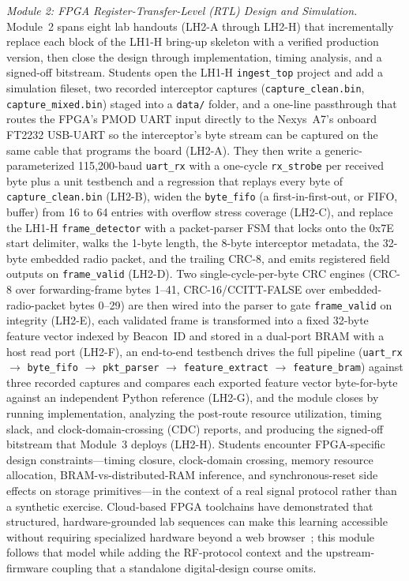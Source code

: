 \documentclass[conference]{IEEEtran}
\begin{document}
\textit{Module 2: FPGA Register-Transfer-Level (RTL) Design and Simulation.} Module~2 spans eight lab handouts (LH2-A through LH2-H) that incrementally replace each block of the LH1-H bring-up skeleton with a verified production version, then close the design through implementation, timing analysis, and a signed-off bitstream. Students open the LH1-H \texttt{ingest\_top} project and add a simulation fileset, two recorded interceptor captures (\texttt{capture\_clean.bin}, \texttt{capture\_mixed.bin}) staged into a \texttt{data/} folder, and a one-line passthrough that routes the FPGA's PMOD UART input directly to the Nexys~A7's onboard FT2232 USB-UART so the interceptor's byte stream can be captured on the same cable that programs the board (LH2-A). They then write a generic-parameterized 115{,}200-baud \texttt{uart\_rx} with a one-cycle \texttt{rx\_strobe} per received byte plus a unit testbench and a regression that replays every byte of \texttt{capture\_clean.bin} (LH2-B), widen the \texttt{byte\_fifo} (a first-in-first-out, or FIFO, buffer) from 16 to 64 entries with overflow stress coverage (LH2-C), and replace the LH1-H \texttt{frame\_detector} with a packet-parser FSM that locks onto the 0x7E start delimiter, walks the 1-byte length, the 8-byte interceptor metadata, the 32-byte embedded radio packet, and the trailing CRC-8, and emits registered field outputs on \texttt{frame\_valid} (LH2-D). Two single-cycle-per-byte CRC engines (CRC-8 over forwarding-frame bytes 1--41, CRC-16/CCITT-FALSE over embedded-radio-packet bytes 0--29) are then wired into the parser to gate \texttt{frame\_valid} on integrity (LH2-E), each validated frame is transformed into a fixed 32-byte feature vector indexed by Beacon~ID and stored in a dual-port BRAM with a host read port (LH2-F), an end-to-end testbench drives the full pipeline (\texttt{uart\_rx} $\rightarrow$ \texttt{byte\_fifo} $\rightarrow$ \texttt{pkt\_parser} $\rightarrow$ \texttt{feature\_extract} $\rightarrow$ \texttt{feature\_bram}) against three recorded captures and compares each exported feature vector byte-for-byte against an independent Python reference (LH2-G), and the module closes by running implementation, analyzing the post-route resource utilization, timing slack, and clock-domain-crossing (CDC) reports, and producing the signed-off bitstream that Module~3 deploys (LH2-H). Students encounter FPGA-specific design constraints---timing closure, clock-domain crossing, memory resource allocation, BRAM-vs-distributed-RAM inference, and synchronous-reset side effects on storage primitives---in the context of a real signal protocol rather than a synthetic exercise. Cloud-based FPGA toolchains have demonstrated that structured, hardware-grounded lab sequences can make this learning accessible without requiring specialized hardware beyond a web browser~\cite{b9}; this module follows that model while adding the RF-protocol context and the upstream-firmware coupling that a standalone digital-design course omits.
\end{document}

